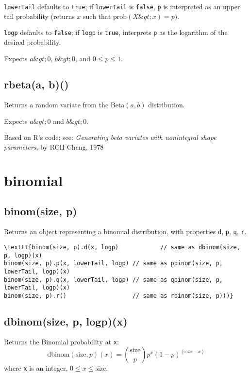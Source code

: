 \documentclass{article}
\begin{document}
\texttt{lowerTail} defaults to \texttt{true}; if \texttt{lowerTail} is \texttt{false}, \texttt{p} is
interpreted as an upper tail probability (returns
$x$ such that $\textrm{prob}(X \&gt; x) = p)$.


\texttt{logp} defaults to \texttt{false}; if \texttt{logp} is \texttt{true}, interprets \texttt{p} as
the logarithm of the desired probability.


Expects $a\&gt;0$, $b\&gt;0$, and $0 \leq p \leq 1$.


    \subsection*{rbeta(a, b)()}
    Returns a random variate from the $\textrm{Beta}(a, b)$ distribution.


Expects $a\&gt;0$ and $b\&gt;0$.


Based on R's code; see: \emph{Generating beta variates with nonintegral shape parameters}, by
RCH Cheng, 1978


  \section{binomial}
    \subsection*{binom(size, p)}
    Returns an object representing a binomial distribution, with properties \texttt{d}, \texttt{p}, \texttt{q}, \texttt{r}.


\begin{lstlisting}
\texttt{binom(size, p).d(x, logp)            // same as dbinom(size, p, logp)(x)
binom(size, p).p(x, lowerTail, logp) // same as pbinom(size, p, lowerTail, logp)(x)
binom(size, p).q(x, lowerTail, logp) // same as qbinom(size, p, lowerTail, logp)(x)
binom(size, p).r()                   // same as rbinom(size, p)()}\end{lstlisting}

    \subsection*{dbinom(size, p, logp)(x)}
    Returns the Binomial probability at \texttt{x}:
$$\textrm{dbinom}(\textrm{size}, p)(x) = \binom{\textrm{size}}{p}p^{x}(1-p)^{(\textrm{size}-x)}$$
where \texttt{x} is an integer, $0 \leq x \leq \textrm{size}$.
\end{document}
